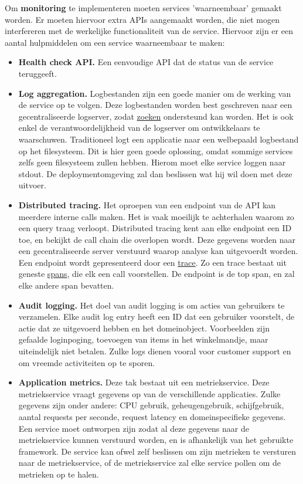\documentclass{report}
\begin{document}
	Om \textbf{monitoring} te implementeren moeten services 'waarneembaar' gemaakt worden. Er moeten hiervoor extra APIs aangemaakt worden, die niet mogen interfereren met de werkelijke functionaliteit van de service. Hiervoor zijn er een aantal hulpmiddelen om een service waarneembaar te maken:
	\begin{itemize}
		\item \textbf{Health check API.} Een eenvoudige API dat de status van de service teruggeeft.
		\item \textbf{Log aggregation.} Logbestanden zijn een goede manier om de werking van de service op te volgen. Deze logbestanden worden best geschreven naar een gecentraliseerde logserver, zodat \underline{zoeken} ondersteund kan worden. Het is ook enkel de verantwoordelijkheid van de logserver om ontwikkelaars te waarschuwen. Traditioneel logt een applicatie naar een welbepaald logbestand op het filesysteem. Dit is hier geen goede oplossing, omdat sommige services zelfs geen filesysteem zullen hebben. Hierom moet elke service loggen naar stdout. De deploymentomgeving zal dan beslissen wat hij wil doen met deze uitvoer. 
		\item \textbf{Distributed tracing.} Het oproepen van een endpoint van de API kan meerdere interne calls maken. Het is vaak moeilijk te achterhalen waarom zo een query traag verloopt. Distributed tracing kent aan elke endpoint een ID toe, en bekijkt de call chain die overlopen wordt. Deze gegevens worden naar een gecentraliseerde server verstuurd waarop analyse kan uitgevoerdt worden. Een endpoint wordt gepresenteerd door een \underline{trace}. Zo een trace bestaat uit geneste \underline{spans}, die elk een call voorstellen. De endpoint is de top span, en zal elke andere span bevatten. 
		\item \textbf{Audit logging.} Het doel van audit logging is om acties van gebruikers te verzamelen. Elke audit log entry heeft een ID dat een gebruiker voorstelt, de actie dat ze uitgevoerd hebben en het domeinobject. Voorbeelden zijn gefaalde loginpoging, toevoegen van items in het winkelmandje, maar uiteindelijk niet betalen. Zulke logs dienen vooral voor customer support en om vreemde activiteiten op te sporen.
		\item \textbf{Application metrics.} Deze tak bestaat uit een metriekservice. Deze metriekservice vraagt gegevens op van de verschillende applicaties. Zulke gegevens zijn onder andere: CPU gebruik, geheugengebruik, schijfgebruik, aantal requests per seconde, request latency en domeinspecifieke gegevens. Een service moet ontworpen zijn zodat al deze gegevens naar de metriekservice kunnen verstuurd worden, en is afhankelijk van het gebruikte framework. De service kan ofwel zelf beslissen om zijn metrieken te versturen naar de metriekservice, of de metriekservice zal elke service pollen om de metrieken op te halen.
	\end{itemize}
\end{document}
